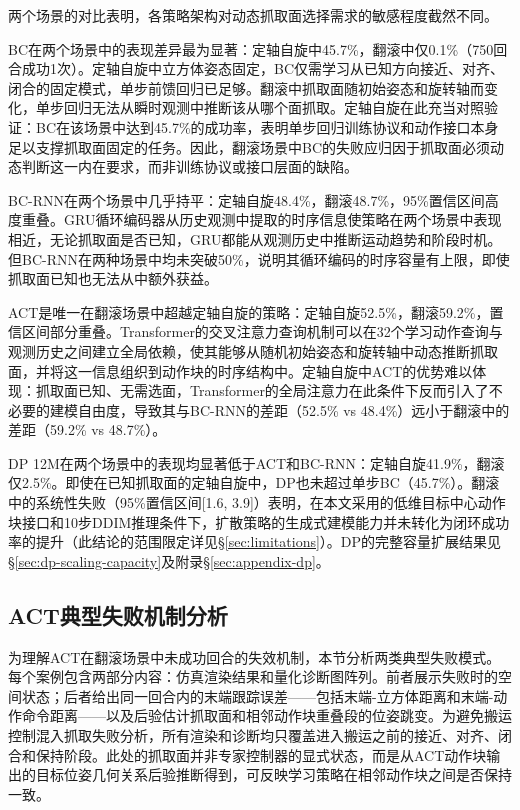 两个场景的对比表明，各策略架构对动态抓取面选择需求的敏感程度截然不同。

BC在两个场景中的表现差异最为显著：定轴自旋中45.7\%，翻滚中仅0.1\%（750回合成功1次）。定轴自旋中立方体姿态固定，BC仅需学习从已知方向接近、对齐、闭合的固定模式，单步前馈回归已足够。翻滚中抓取面随初始姿态和旋转轴而变化，单步回归无法从瞬时观测中推断该从哪个面抓取。定轴自旋在此充当对照验证：BC在该场景中达到45.7\%的成功率，表明单步回归训练协议和动作接口本身足以支撑抓取面固定的任务。因此，翻滚场景中BC的失败应归因于抓取面必须动态判断这一内在要求，而非训练协议或接口层面的缺陷。

BC-RNN在两个场景中几乎持平：定轴自旋48.4\%，翻滚48.7\%，95\%置信区间高度重叠。GRU循环编码器从历史观测中提取的时序信息使策略在两个场景中表现相近，无论抓取面是否已知，GRU都能从观测历史中推断运动趋势和阶段时机。但BC-RNN在两种场景中均未突破50\%，说明其循环编码的时序容量有上限，即使抓取面已知也无法从中额外获益。

ACT是唯一在翻滚场景中超越定轴自旋的策略：定轴自旋52.5\%，翻滚59.2\%，置信区间部分重叠。Transformer的交叉注意力查询机制可以在32个学习动作查询与观测历史之间建立全局依赖，使其能够从随机初始姿态和旋转轴中动态推断抓取面，并将这一信息组织到动作块的时序结构中。定轴自旋中ACT的优势难以体现：抓取面已知、无需选面，Transformer的全局注意力在此条件下反而引入了不必要的建模自由度，导致其与BC-RNN的差距（52.5\% vs 48.4\%）远小于翻滚中的差距（59.2\% vs 48.7\%）。

DP 12M在两个场景中的表现均显著低于ACT和BC-RNN：定轴自旋41.9\%，翻滚仅2.5\%。即使在已知抓取面的定轴自旋中，DP也未超过单步BC（45.7\%）。翻滚中的系统性失败（95\%置信区间[1.6, 3.9]）表明，在本文采用的低维目标中心动作块接口和10步DDIM推理条件下，扩散策略的生成式建模能力并未转化为闭环成功率的提升（此结论的范围限定详见\S\ref{sec:limitations}）。DP的完整容量扩展结果见\S\ref{sec:dp-scaling-capacity}及附录\S\ref{sec:appendix-dp}。

\subsection{ACT典型失败机制分析}\label{sec:act-failure-cases}

为理解ACT在翻滚场景中未成功回合的失效机制，本节分析两类典型失败模式。每个案例包含两部分内容：仿真渲染结果和量化诊断图阵列。前者展示失败时的空间状态；后者给出同一回合内的末端跟踪误差——包括末端-立方体距离和末端-动作命令距离——以及后验估计抓取面和相邻动作块重叠段的位姿跳变。为避免搬运控制混入抓取失败分析，所有渲染和诊断均只覆盖进入搬运之前的接近、对齐、闭合和保持阶段。此处的抓取面并非专家控制器的显式状态，而是从ACT动作块输出的目标位姿几何关系后验推断得到，可反映学习策略在相邻动作块之间是否保持一致。

